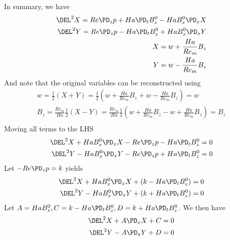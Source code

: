 \documentclass[11pt]{article}
\begin{document}
\noindent
In summary, we have
\begin{equation}\begin{aligned}
\DEL^2 X = Re\PD_z p + Ha \PD_t B_z^0 - Ha B_x^0 \PD_x X \\
\DEL^2 Y = Re\PD_z p - Ha \PD_t B_z^0 + Ha B_x^0 \PD_x Y \\
X = w + \frac{Ha}{Re_m} B_z \\
Y = w - \frac{Ha}{Re_m} B_z \\
\end{aligned} \end{equation}
And note that the original variables can be reconstructed using
\begin{equation}\begin{aligned}
w   =                 \frac{1}{2} (X + Y) =                 \frac{1}{2} \left( w + \frac{Ha}{Re_m} B_z + w - \frac{Ha}{Re_m} B_z \right) = w   \\
B_z = \frac{Re_m}{Ha} \frac{1}{2} (X - Y) = \frac{Re_m}{Ha} \frac{1}{2} \left( w + \frac{Ha}{Re_m} B_z - w + \frac{Ha}{Re_m} B_z \right) = B_z \\
\end{aligned} \end{equation}
Moving all terms to the LHS
\begin{equation}\begin{aligned}
\DEL^2 X + Ha B_x^0 \PD_x X - Re\PD_z p - Ha \PD_t B_z^0 = 0 \\
\DEL^2 Y - Ha B_x^0 \PD_x Y - Re\PD_z p + Ha \PD_t B_z^0 = 0 \\
\end{aligned} \end{equation}
Let $-Re \PD_z p = k$ yields
\begin{equation}\begin{aligned}
\DEL^2 X + Ha B_x^0 \PD_x X + (k - Ha \PD_t B_z^0) = 0 \\
\DEL^2 Y - Ha B_x^0 \PD_x Y + (k + Ha \PD_t B_z^0) = 0 \\
\end{aligned} \end{equation}
Let $A = Ha B_x^0, C = k - Ha \PD_t B_z^0, D = k + Ha \PD_t B_z^0$. We then have
\begin{equation}\begin{aligned}
\DEL^2 X + A \PD_x X + C = 0 \\
\DEL^2 Y - A \PD_x Y + D = 0 \\
\end{aligned} \end{equation}
\end{document}
